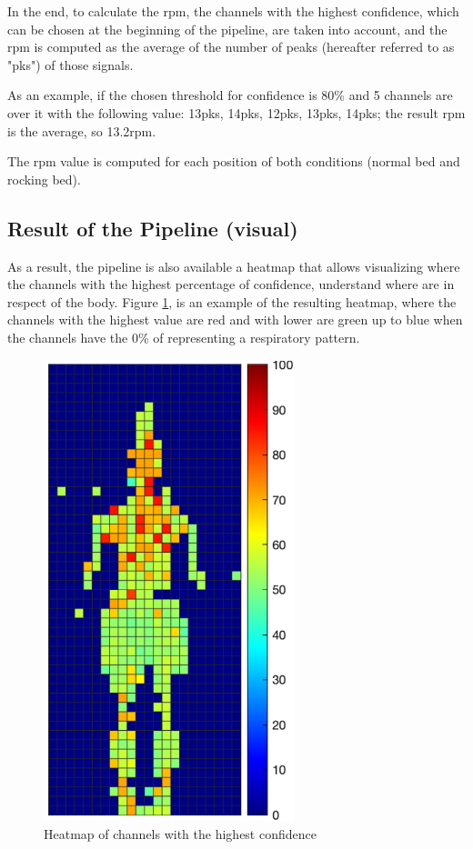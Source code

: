 In the end, to calculate the rpm, the channels with the highest confidence, which can be chosen at the beginning of the pipeline, are taken into account, and the rpm is computed as the average of the number of peaks (hereafter referred to as "pks") of those signals.

As an example, if the chosen threshold for confidence is 80\% and 5 channels are over it with the following value: 13pks, 14pks, 12pks, 13pks, 14pks; the result rpm is the average, so 13.2rpm.

The rpm value is computed for each position of both conditions (normal bed and rocking bed).

\subsection{Result of the Pipeline (visual)} \label{cap:resultVisual}
As a result, the pipeline is also available a heatmap that allows visualizing where the channels with the highest percentage of confidence, understand where are in respect of the body. Figure \ref{fig:heat}, is an example of the resulting heatmap, where the channels with the highest value are red and with lower are green up to blue when the channels have the 0\% of representing a respiratory pattern.

\begin{figure}[h]
    \centering
    \includegraphics[width=0.65\textwidth]{img/total.png}
    \caption{Heatmap of channels with the highest confidence}
    \label{fig:heat}
\end{figure}
